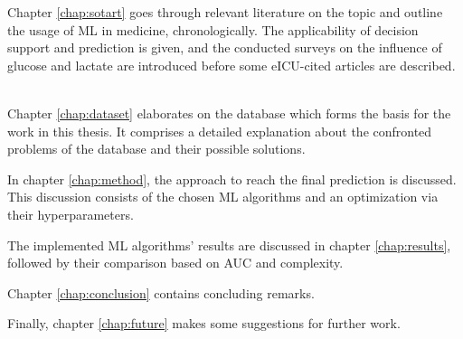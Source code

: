 Chapter \ref{chap:sotart} goes through relevant literature on the topic and outline the usage of \acrshort{ML} in medicine, chronologically. The applicability of decision support and prediction is given, and the conducted surveys on the influence of glucose and lactate are introduced before some eICU-cited articles are described. \

Chapter \ref{chap:dataset} elaborates on the database which forms the basis for the work in this thesis. It comprises a detailed explanation about the confronted problems of the database and their possible solutions. \

In chapter \ref{chap:method}, the approach to reach the final prediction is discussed. This discussion consists of the chosen \acrshort{ML} algorithms and an optimization via their hyperparameters.\

The implemented \acrshort{ML} algorithms' results are discussed in chapter \ref{chap:results}, followed by their comparison based on \acrshort{AUC} and complexity.\

Chapter \ref{chap:conclusion} contains concluding remarks. \

Finally, chapter \ref{chap:future} makes some suggestions for further work.

\label{ssec:gantt}
\begin{figure}[H]
\end{figure}
